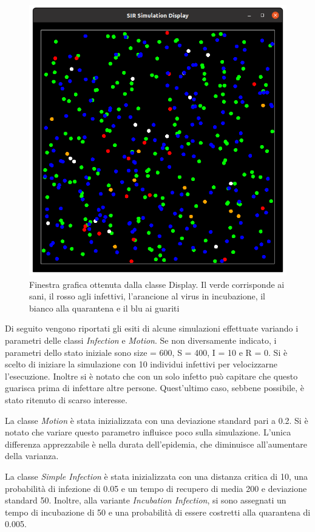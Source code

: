 \documentclass[a4paper,10pt,twocolumn]{article}
\begin{document}
\begin{figure}[hbt]
    \includegraphics[width=\linewidth]{images/display.png}
    \caption{Finestra grafica ottenuta dalla classe Display. Il verde corrisponde ai sani, il rosso agli infettivi, l'arancione al virus in incubazione, il bianco alla quarantena e il blu ai guariti}
    \label{fig:display}
\end{figure}

Di seguito vengono riportati gli esiti di alcune simulazioni effettuate variando i parametri delle classi \emph{Infection} e \emph{Motion}. Se non diversamente indicato, i parametri  dello stato iniziale sono size = 600, S = 400, I = 10 e  R = 0. Si è scelto di iniziare la simulazione con 10 individui infettivi per velocizzarne l'esecuzione. Inoltre si è notato che  con un solo infetto può capitare che questo guarisca prima di infettare altre persone. Quest'ultimo caso, sebbene possibile, è stato ritenuto di scarso interesse.

La classe \emph{Motion} è stata inizializzata con una deviazione standard pari a 0.2. Si è notato che variare questo parametro influisce poco sulla simulazione. L'unica differenza apprezzabile è nella durata dell'epidemia, che diminuisce all'aumentare della varianza.

La classe \emph{Simple Infection} è stata inizializzata con una distanza critica di 10, una probabilità di infezione di 0.05 e un tempo di recupero di media 200 e deviazione standard 50. Inoltre, alla variante \emph{Incubation Infection}, si sono assegnati un tempo di incubazione di 50 e una probabilità di essere costretti alla quarantena di 0.005.
\end{document}
